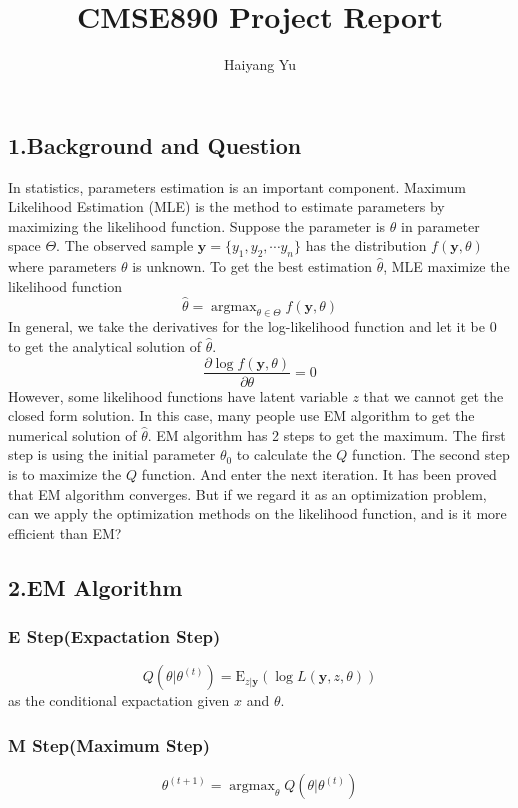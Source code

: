\documentclass{article}
\title{CMSE890 Project Report}
\author{Haiyang Yu}
\date{}
\begin{document}
\maketitle

\subsection*{1.Background and Question}
In statistics, parameters estimation is an important component. Maximum Likelihood Estimation (MLE) is the method to estimate parameters by maximizing the likelihood function. Suppose the parameter is $\theta$ in parameter space $\Theta$. The observed sample $\bm{y}=\{y_{1},y_{2},\cdots y_{n}\}$ has the distribution $f(\bm{y},\theta)$ where parameters $\theta$ is unknown. To get the best estimation $\hat{\theta}$, MLE maximize the likelihood function 
$$\hat{\theta}=\mathop{\arg\max}_{\theta\in\Theta}f(\bm{y},\theta)$$
In general, we take the derivatives for the log-likelihood function and let it be 0 to get the analytical solution of $\hat{\theta}$.
$$\frac{\partial \log{f(\bm{y},\theta)}}{\partial \theta}=0$$
However, some likelihood functions have latent variable $z$ that we cannot get the closed form solution. In this case, many people use EM algorithm to get the numerical solution of $\hat{\theta}$. EM algorithm has 2 steps to get the maximum. The first step is using the initial parameter $\theta_{0}$ to calculate the $Q$ function.
The second step is to maximize the $Q$ function. And enter the next iteration. It has been proved that EM algorithm converges. But if we regard it as an optimization problem, can we apply the optimization methods on the likelihood function, and is it more efficient than EM?
\subsection*{2.EM Algorithm}
\subsubsection*{E Step(Expactation Step)}

$$Q(\theta|\theta^{(t)})=\mathrm{E}_{z|\bm{y}}(\log{L(\bm{y},z,\theta)})$$as the conditional expactation given $x$ and $\theta$.

\subsubsection*{M Step(Maximum Step)}
$$\theta^{(t+1)}=\mathop{\arg\max}_{\theta}Q(\theta|\theta^{(t)})$$
\end{document}
